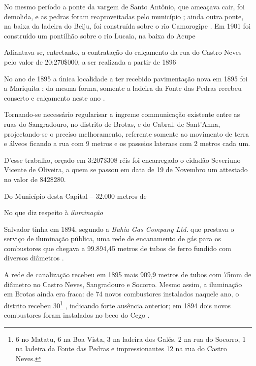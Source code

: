 No mesmo período a ponte da vargem de Santo Antônio, que ameaçava cair, foi demolida, e as pedras foram reaproveitadas pelo município \cite[p.~137]{salvador_relatorio_1896}; ainda outra ponte, na baixa da ladeira do Beiju, foi construída sobre o rio Camorogipe \cite[p.~156]{salvador_relatorio_1894}. Em 1901 foi construído um pontilhão sobre o rio Lucaia, na baixa do Acupe 

Adiantava-se, entretanto, a contratação do calçamento da rua do Castro Neves pelo valor de 20:270\$000, a ser realizada a partir de 1896 \cite[p.~23]{salvador_relatorio_1896}

No ano de 1895 a única localidade a ter recebido pavimentação nova em 1895 foi a Mariquita \cite[p.~16]{salvador_relatorio_1896}; da mesma forma, somente a ladeira da Fonte das Pedras recebeu conserto e calçamento neste ano \cite[p.~16]{salvador_relatorio_1896}. 



\begin{citacao}
Tornando-se necessário regularisar a íngreme communicação existente entre as ruas do Sangradouro, no distrito de Brotas, e do Cabral, de Sant'Anna, projectando-se o preciso melhoramento, referente somente ao movimento de terra e álveos ficando a rua com 9 metros e os passeios lateraes com 2 metros cada um.

D'esse trabalho, orçado em 3:207\$308 réis foi encarregado o cidadão Severiuno Vicente de Oliveira, a quem se passou em data de 19 de Novembro um attestado no valor de 842\$280.
\end{citacao}

\begin{citacao}
Do Município desta Capital -- 32.000 metros de 
\end{citacao}








No que diz respeito à \textit{iluminação}


Salvador tinha em 1894, segundo a \textit{Bahia Gas Company Ltd.} que prestava o serviço de iluminação pública, uma rede de encanamento de gás para os combustores que chegava a 99.894,45 metros de tubos de ferro fundido com diversos diâmetros \cite[p.~178]{salvador_relatorio_1894}.

A rede de canalização recebeu em 1895 mais 909,9 metros de tubos com 75mm de diâmetro no Castro Neves, Sangradouro e Socorro. Mesmo assim, a iluminação em Brotas ainda era fraca: de 74 novos combustores instalados naquele ano, o distrito recebeu 30\footnote{6 no Matatu, 6 na Boa Vista, 3 na ladeira dos Galés, 2 na rua do Socorro, 1 na ladeira da Fonte das Pedras e impressionantes 12 na rua do Castro Neves.} \cite[pp.~149-150]{salvador_relatorio_1896}, indicando forte ausência anterior; em 1894 dois novos combustores foram instalados no beco do Cego \cite[p.~179]{salvador_relatorio_1894}.


